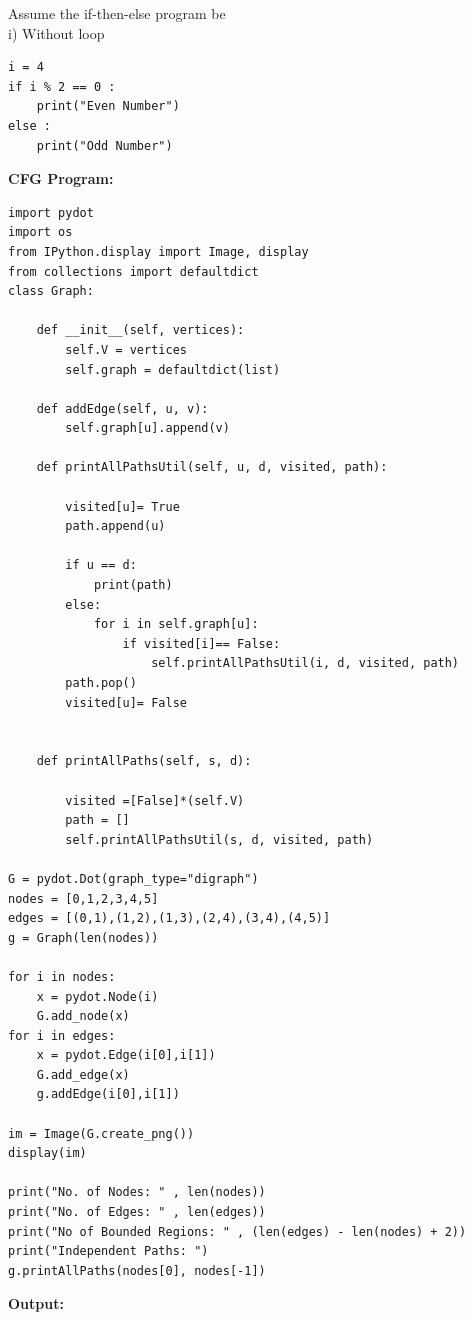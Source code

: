 \documentclass[12pt, letterpaper, twoside]{book}
\begin{document}
Assume the if-then-else program be\\
i) Without loop\\
\begin{lstlisting}
i = 4
if i % 2 == 0 :
	print("Even Number")
else :
	print("Odd Number")
\end{lstlisting}
\begin{flushleft}
\textbf{CFG Program: }
\end{flushleft}
\begin{lstlisting}
import pydot
import os
from IPython.display import Image, display
from collections import defaultdict
class Graph: 

    def __init__(self, vertices):  
        self.V = vertices 
        self.graph = defaultdict(list) 

    def addEdge(self, u, v): 
        self.graph[u].append(v) 

    def printAllPathsUtil(self, u, d, visited, path): 

        visited[u]= True
        path.append(u) 

        if u == d: 
            print(path) 
        else: 
            for i in self.graph[u]: 
                if visited[i]== False: 
                    self.printAllPathsUtil(i, d, visited, path) 
        path.pop() 
        visited[u]= False


    def printAllPaths(self, s, d): 

        visited =[False]*(self.V) 
        path = [] 
        self.printAllPathsUtil(s, d, visited, path)

G = pydot.Dot(graph_type="digraph")
nodes = [0,1,2,3,4,5]
edges = [(0,1),(1,2),(1,3),(2,4),(3,4),(4,5)]
g = Graph(len(nodes))

for i in nodes:
    x = pydot.Node(i)
    G.add_node(x)
for i in edges:
    x = pydot.Edge(i[0],i[1])
    G.add_edge(x)
    g.addEdge(i[0],i[1])

im = Image(G.create_png())
display(im)

print("No. of Nodes: " , len(nodes))
print("No. of Edges: " , len(edges))
print("No of Bounded Regions: " , (len(edges) - len(nodes) + 2))
print("Independent Paths: ")
g.printAllPaths(nodes[0], nodes[-1])
\end{lstlisting}
\begin{flushleft}
\pagebreak
\textbf{Output:}
\end{flushleft}
\end{document}
